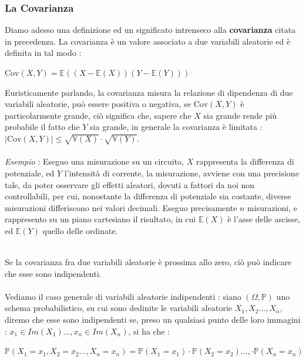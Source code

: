 \documentclass[12pt, letterpaper]{article}
\newcommand{\E}{{\mathbb E}}
\newcommand{\V}{{\mathbb V}}
\newcommand{\acc}{\\\hphantom{}\\}
\newcommand{\Prob}{{\mathbb P}}
\begin{document}
  \subsubsection{La Covarianza}
  Diamo adesso una definizione ed un significato intrenseco alla \textbf{covarianza}
citata in precedenza. La covarianza è un valore associato a due variabili 
aleatorie ed è definita in tal modo :\begin{center}
    \(
    \text{Cov}(X,Y)=\E((X-\E(X))(Y-\E(Y)))    
    \)
\end{center}
Euristicamente parlando, la covarianza misura la relazione di dipendenza di 
due variabili aleatorie, può essere positiva o negativa, se 
\(\text{Cov}(X,Y)\) è particolarmente grande, ciò significa che, 
sapere che \(X\) sia grande rende più probabile il fatto che \(Y\) 
sia grande, in generale la covarianza è limitata : \(|\text{Cov}(X,Y)|\le\sqrt{\V(X)}\cdot\sqrt{\V(Y)}\).
\acc 
\textit{Esempio} : Eseguo una misurazione su un circuito, \(X\) rappresenta 
la differenza di potenziale, ed \(Y\) l'intensità di corrente, la misurazione, avviene 
con una precisione tale, da poter osservare gli effetti aleatori, dovuti a fattori 
da noi non controllabili, per cui, nonostante la differenza di potenziale sia costante, 
diverse misurazioni differiscono nei valori decimali. Eseguo precisamente 
\(n\) misurazioni, e rappresento su un piano cartesiano il risultato, 
in cui \(\E(X)\) è l'asse delle ascisse, ed \(\E(Y)\) quello 
delle ordinate.
\begin{figure}[h]
\end{figure}\\
Se la covarianza fra due variabili aleatorie è prossima allo zero, ciò può indicare che esse sono 
indipendenti.\acc 
Vediamo il caso generale di variabili aleatorie indipendenti : siano \((\Omega,\Prob)\) uno schema
probabilistico, su cui sono dedinite le variabili aleatorie \(X_1,X_2\dots,X_n\), diremo che esse 
sono indipendenti se, preso un qualsiasi punto delle loro immagini : 
\(x_1\in Im(X_1)\dots,x_n\in Im(X_n)\), si ha che :\begin{center}
    \(
        \Prob(X_1=x_1,X_2=x_2\dots,X_n=x_n)=\Prob(X_1=x_1)\cdot \Prob(X_2=x_2)\dots,\cdot\Prob(X_n=x_n)
    \)
\end{center}
\end{document}
